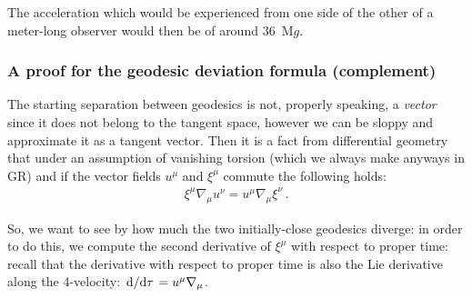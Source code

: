 \documentclass[main.tex]{subfiles}
\begin{document}
The acceleration which would be experienced from one side of the other of a meter-long observer would then be of around \SI{36}{M}\(g\). 

\subsubsection{A proof for the geodesic deviation formula (complement)}

The starting separation between geodesics is not, properly speaking, a \emph{vector} since it does not belong to the tangent space, however we can be sloppy and approximate it as a tangent vector.
Then it is a fact from differential geometry that under an assumption of vanishing torsion (which we always make anyways in GR) and if the vector fields \(u^{\mu }\) and \(\xi^{\mu }\) commute the following holds: 
%
\begin{align} \label{eq:lie-bracket-commutation}
  \xi^{\mu } \nabla_{\mu } u^{\nu } = u^{\mu } \nabla_{\mu } \xi^{\nu }
\,.
\end{align}


So, we want to see by how much the two initially-close geodesics diverge: in order to do this, we compute the second derivative of \(\xi^{\mu }\) with respect to proper time: recall that the derivative with respect to proper time is also the Lie derivative along the 4-velocity: \(\dv*{}{\tau } = u^{\mu } \nabla_{\mu }\). 
\end{document}

